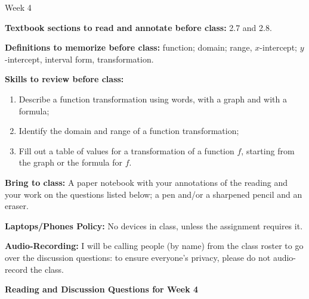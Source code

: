 \documentclass[12pt,dvipsnames]{article}
\begin{document}
\thispagestyle{empty}

	\begin{center}
		{\large{Week 4}}
	\end{center}

{\bfseries{Textbook sections to read and annotate before class:}}  2.7 and 2.8.
\smallskip

	{\bfseries{Definitions to memorize before class:}} function;  domain; range, $x$-intercept; $y$-intercept,  interval form, transformation.
\smallskip	
	
{\bfseries{Skills to review before class:} }
	\begin{enumerate} 
		\item Describe a function transformation using words, with a graph and with a formula;
\item Identify the domain and range of a function transformation;
\item Fill out a table of values for a transformation of a function $f$, starting from the graph or the formula for $f$.
		
\end{enumerate}
	
		
{\bfseries{Bring to class:} } A paper notebook with your annotations of the reading and your work on the questions listed below; a pen and/or a sharpened pencil and an eraser.

{\bfseries{Laptops/Phones Policy:}}  No devices in class, unless the assignment requires it.

{\bfseries{Audio-Recording:}} I will be calling people (by name) from the class roster to go over the discussion questions: to ensure everyone's privacy, please do not audio-record the class.


\begin{center}

{\large{\bfseries{Reading and Discussion Questions for Week 4} }}
\end{center}
\end{document}
